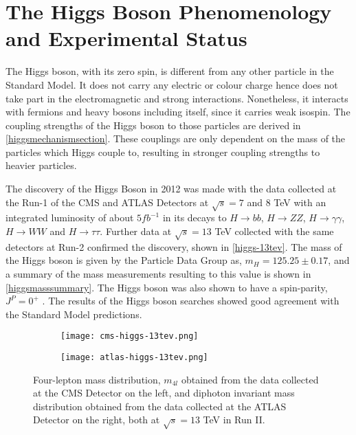 \section{The Higgs Boson Phenomenology and Experimental Status}\label{higgs-status}

The Higgs boson, with its zero spin, is different from any other particle in the Standard Model. It does not carry any electric or colour charge hence does not take part in the electromagnetic and strong interactions. Nonetheless, it interacts with fermions and heavy bosons including itself, since it carries weak isospin. The coupling strengths of the Higgs boson to those particles are derived in \autoref{higgsmechanismsection}. These couplings are only dependent on the mass of the particles which Higgs couple to, resulting in stronger coupling strengths to heavier particles.

The discovery of the Higgs Boson in 2012 was made with the data collected at the Run-1 of the CMS and ATLAS Detectors at $\sqrt{s} = 7$ and $8$ TeV with an integrated luminosity of about $5 fb^{-1}$ in its decays to $H\rightarrow bb$, $H\rightarrow ZZ$, $H\rightarrow \gamma\gamma$, $H\rightarrow WW$ and $H\rightarrow \tau\tau$. Further data at $\sqrt{s} = 13$ TeV collected with the same detectors at Run-2 confirmed the discovery, shown in \autoref{higgs-13tev}. The mass of the Higgs boson is given by the Particle Data Group\cite{pdg} as, $ m_H = 125.25\pm 0.17$, and a summary of the mass measurements resulting to this value is shown in \autoref{higgsmasssummary}. The Higgs boson was also shown to have a spin-parity, $J^P=0^+$ \cite{higgs-spin}. The results of the Higgs boson searches showed good agreement with the Standard Model predictions.

\begin{figure*}[ht]
        \centering
        \begin{subfigure}[b]{0.475\textwidth}
            \centering
            \texttt{[image: cms-higgs-13tev.png]}
            \vspace{-0.5cm}
        \end{subfigure}
        \hspace{0.2cm}
        \begin{subfigure}[b]{0.475\textwidth}  
            \centering 
            \texttt{[image: atlas-higgs-13tev.png]}
            \vspace{-0.5cm}
        \end{subfigure}
        \caption[Four-lepton mass distribution, $m_{4l}$ obtained from the data collected at the CMS Detector on the left, and diphoton invariant mass distribution obtained from the data collected at the ATLAS Detector on the right, both at $\sqrt{s}=13$ TeV in Run II.]
        {\small Four-lepton mass distribution, $m_{4l}$ obtained from the data collected at the CMS Detector\cite{cms-higgs-13tev} on the left, and diphoton invariant mass distribution obtained from the data collected at the ATLAS Detector\cite{atlas-higgs-13tev} on the right, both at $\sqrt{s}=13$ TeV in Run II.} 
        \label{higgs-13tev}
\end{figure*}

